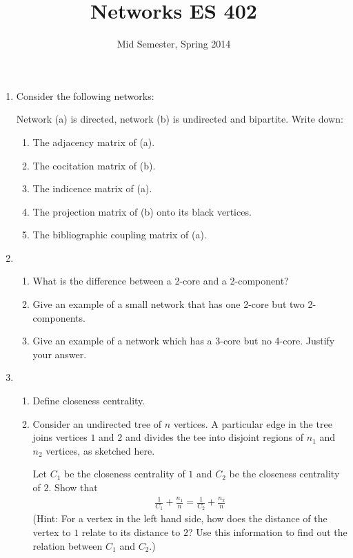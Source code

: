 \documentclass[a4paper,10pt]{article}
\title{Networks ES 402}
\author{Mid Semester, Spring 2014}
\begin{document}
\maketitle

\begin{enumerate}
 \item Consider the following networks:
 \vspace*{2in}
 
 
 Network (a) is directed, network (b) is undirected and bipartite. Write down:
 \begin{enumerate}
 \item The adjacency matrix of (a).
 \item The cocitation matrix of (b).
 \item The indicence matrix of (a).
 \item The projection matrix of (b) onto its black vertices. 
 \item The bibliographic coupling matrix of (a). 
\end{enumerate}


\item 
\begin{enumerate}
\item What is the difference between a 2-core and a 2-component? 
\item Give an example of a small network that
has one 2-core but two 2-components.  
\item Give an example of a network which has a 3-core but no 4-core. Justify your answer.
\end{enumerate}


\item 
\begin{enumerate}
\item Define closeness centrality.
\item Consider an undirected tree of $n$ vertices. A particular edge in the tree joins vertices $1$ and $2$
and divides the tee into disjoint regions of $n_1$ and $n_2$ vertices, as sketched here. 
\vspace*{2in}

Let $C_1$ be the closeness
centrality of $1$ and $C_2$ be the closeness centrality of $2$. Show that
\begin{align*}
\frac{1}{C_1} + \frac{n_1}{n} = \frac{1}{C_2} + \frac{n_2}{n}
\end{align*}
(Hint: For a vertex in the left hand side, how does the distance of the vertex to $1$ relate to its distance to $2$? 
Use this information to find out the relation between $C_1$ and $C_2$.) 


\end{enumerate}
\end{enumerate}
\end{document}
